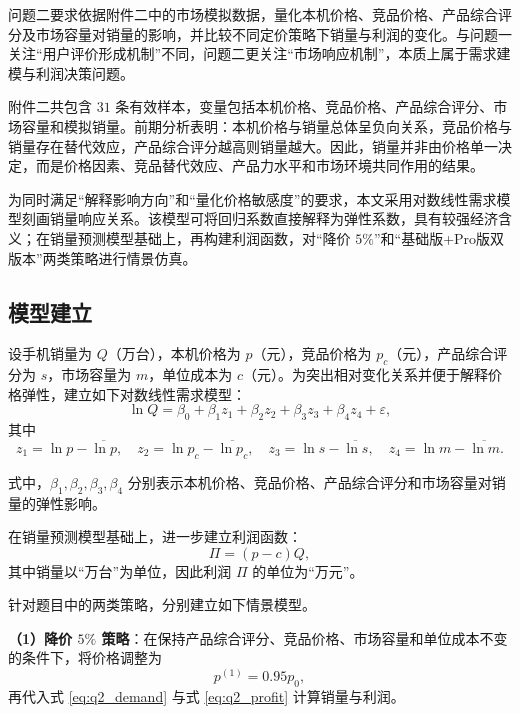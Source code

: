 \documentclass[withoutpreface,bwprint]{cumcmthesis} %
\begin{document}
问题二要求依据附件二中的市场模拟数据，量化本机价格、竞品价格、产品综合评分及市场容量对销量的影响，并比较不同定价策略下销量与利润的变化。与问题一关注“用户评价形成机制”不同，问题二更关注“市场响应机制”，本质上属于需求建模与利润决策问题。

附件二共包含 $31$ 条有效样本，变量包括本机价格、竞品价格、产品综合评分、市场容量和模拟销量。前期分析表明：本机价格与销量总体呈负向关系，竞品价格与销量存在替代效应，产品综合评分越高则销量越大。因此，销量并非由价格单一决定，而是价格因素、竞品替代效应、产品力水平和市场环境共同作用的结果。

为同时满足“解释影响方向”和“量化价格敏感度”的要求，本文采用对数线性需求模型刻画销量响应关系\cite{wooldridge2020,varian2014}。该模型可将回归系数直接解释为弹性系数，具有较强经济含义；在销量预测模型基础上，再构建利润函数，对“降价 $5\%$”和“基础版+Pro版双版本”两类策略进行情景仿真。

\subsection{模型建立}

设手机销量为 $Q$（万台），本机价格为 $p$（元），竞品价格为 $p_c$（元），产品综合评分为 $s$，市场容量为 $m$，单位成本为 $c$（元）。为突出相对变化关系并便于解释价格弹性，建立如下对数线性需求模型：
\begin{equation}
\ln Q=\beta_0+\beta_1z_1+\beta_2z_2+\beta_3z_3+\beta_4z_4+\varepsilon,
\label{eq:q2_demand}
\end{equation}
其中
\begin{equation}
z_1=\ln p-\overline{\ln p},\quad
z_2=\ln p_c-\overline{\ln p_c},\quad
z_3=\ln s-\overline{\ln s},\quad
z_4=\ln m-\overline{\ln m}.
\label{eq:q2_center}
\end{equation}

式中，$\beta_1,\beta_2,\beta_3,\beta_4$ 分别表示本机价格、竞品价格、产品综合评分和市场容量对销量的弹性影响。

在销量预测模型基础上，进一步建立利润函数：
\begin{equation}
\Pi=(p-c)Q,
\label{eq:q2_profit}
\end{equation}
其中销量以“万台”为单位，因此利润 $\Pi$ 的单位为“万元”。

针对题目中的两类策略，分别建立如下情景模型。

\textbf{（1）降价 $5\%$ 策略}：在保持产品综合评分、竞品价格、市场容量和单位成本不变的条件下，将价格调整为
\begin{equation}
p^{(1)}=0.95p_0,
\label{eq:q2_strategy1}
\end{equation}
再代入式 \eqref{eq:q2_demand} 与式 \eqref{eq:q2_profit} 计算销量与利润。
\end{document}

